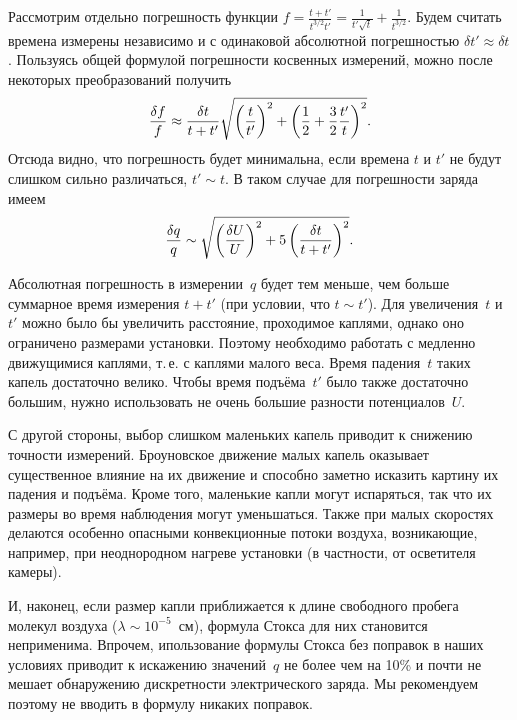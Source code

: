 Рассмотрим отдельно погрешность функции
$f=\frac{t+t'}{t^{3/2}t'} = \frac{1}{t'\sqrt{t}} + \frac{1}{t^{3/2}}$. 
Будем считать времена измерены независимо и с одинаковой абсолютной погрешностью 
$\delta {t'}\approx \delta t$.
Пользуясь общей формулой погрешности косвенных 
измерений, можно после некоторых преобразований получить
\begin{equation}
\frac{\delta f}{f} \approx 
\frac{\delta t}{t+t'} 
\sqrt{\left(\frac{t}{t'} \right)^2 + 
    \left(\frac12 + \frac32 \frac{t'}{t}\right)^2}.
\eqmark{3.3.12}
\end{equation}
Отсюда видно, что погрешность будет минимальна, если времена
$t$ и $t'$ не будут слишком сильно различаться, $t'\sim t$.
В таком случае для погрешности заряда имеем
\begin{equation}
	\frac{\delta q}{q} \sim 
    \sqrt{\left(\frac{\delta U}{U}\right)^2 + 5 \left(\frac{\delta t}{t+t'}\right)^2}.
	\eqmark{3.3.13}
\end{equation}

Абсолютная погрешность в измерении~$q$ будет тем меньше, 
чем больше суммарное время измерения $t+t'$ (при условии, что $t\sim t'$). 
Для увеличения~$t$ и~$t'$ можно было бы увеличить
расстояние, проходимое каплями, однако оно ограничено размерами установки. 
Поэтому необходимо работать с медленно движущимися каплями, т.\,е. с каплями 
малого веса. Время падения~$t$ таких капель достаточно велико. 
Чтобы время подъёма~$t'$ было также достаточно большим, нужно
использовать не очень большие разности потенциалов~$U$.

С другой стороны, выбор слишком маленьких капель приводит к снижению точности
измерений. Броуновское движение малых капель оказывает существенное влияние на
их движение и способно заметно исказить картину их падения и подъёма. 
Кроме того, маленькие капли могут испаряться, так что их размеры во время 
наблюдения могут уменьшаться. Также при малых скоростях делаются особенно 
опасными конвекционные потоки воздуха, возникающие, например, при неоднородном нагреве
установки (в частности, от осветителя камеры). 

И, наконец, если размер капли приближается к длине свободного пробега
молекул воздуха ($\lambda \sim 10^{-5}$~см), формула Стокса 
для них становится неприменима. Впрочем, ипользование формулы Стокса без поправок
в наших условиях приводит к искажению значений~$q$ не более 
чем на 10\% и почти не мешает обнаружению дискретности электрического заряда. 
Мы рекомендуем поэтому не вводить в формулу никаких поправок.

